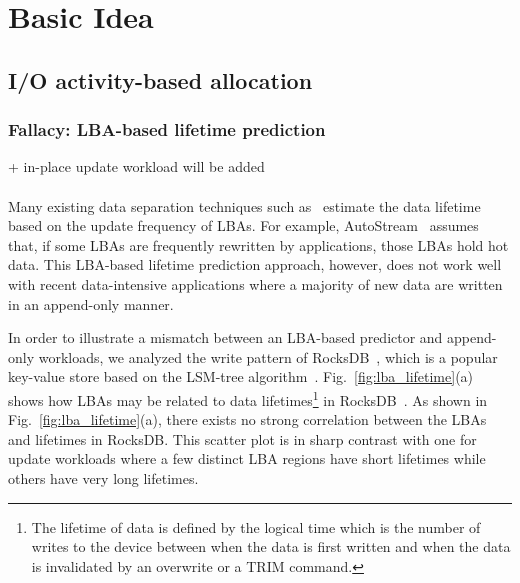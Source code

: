 \section{Basic Idea}
\subsection{I/O activity-based allocation}
\subsubsection{Fallacy: LBA-based lifetime prediction}
+ in-place update workload will be added \\ \\
Many existing data separation techniques such as~\cite{AutoStream, HotCold} 
estimate the data lifetime based on the update frequency of LBAs.  
For example, \textsf{\small AutoStream}~\cite{AutoStream} assumes that, if
some LBAs are frequently rewritten by applications, those LBAs hold hot data.
This LBA-based lifetime prediction 
approach, however, does not work well with recent data-intensive 
applications where a majority of
new data are written in an append-only manner.  

In order to illustrate a mismatch between an LBA-based predictor and 
append-only workloads, we analyzed the write pattern of 
RocksDB~\cite{RocksDB}, which is a
popular key-value store based on the LSM-tree algorithm~\cite{LSM}.
Fig.~\ref{fig:lba_lifetime}(a) shows how LBAs may be related 
to data lifetimes\footnote{The lifetime of data is defined 
by the logical time which is the number of writes to the device 
between when the data is first written 
and when the data is invalidated by an overwrite or a TRIM command.}
in RocksDB~\cite{RocksDB}.  
As shown in Fig.~\ref{fig:lba_lifetime}(a), 
there exists no strong correlation between the LBAs and lifetimes in RocksDB.  
This scatter plot is in sharp contrast with one for update workloads 
where a few distinct LBA regions have short lifetimes while others 
have very long lifetimes.

